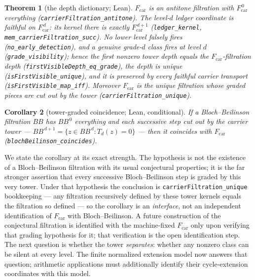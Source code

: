 \documentclass[11pt]{article}
\newtheorem{theorem}{Theorem}[section]
\newtheorem{corollary}[theorem]{Corollary}
\theoremstyle{definition}
\theoremstyle{remark}
\newcommand{\Fcar}{F_{\mathrm{car}}}
\begin{document}
\begin{theorem}[the depth dictionary; Lean]\label{thm:dictionary}
$\Fcar$ is an antitone filtration with $\Fcar^{\,0}$ everything
\textup{(\texttt{carrierFiltration\_antitone})}. The level-$d$ ledger
coordinate is faithful on $\Fcar^{\,d}$: its kernel there is exactly
$\Fcar^{\,d+1}$ \textup{(\texttt{ledger\_kernel},
\texttt{mem\_carrierFiltration\_succ})}. No lower level falsely fires
\textup{(\texttt{no\_early\_detection})}, and a genuine grade-$d$ class fires
at level $d$ \textup{(\texttt{grade\_visibility})}; hence the first nonzero
tower depth equals the $\Fcar$-filtration depth
\textup{(\texttt{firstVisibleDepth\_eq\_grade})}, the depth is unique
\textup{(\texttt{isFirstVisible\_unique})}, and it is preserved by every
faithful carrier transport \textup{(\texttt{isFirstVisible\_map\_iff})}.
Moreover $\Fcar$ is the unique filtration whose graded pieces are cut out by
the tower \textup{(\texttt{carrierFiltration\_unique})}.
\end{theorem}

\begin{corollary}[tower-graded coincidence; Lean, conditional]\label{cor:bb}
If a Bloch--Beilinson filtration \cite{Beilinson,Bloch,Murre} $BB$ has
$BB^{\,0}$ everything and each successive step cut out by the carrier tower ---
$BB^{\,d+1}=\{z\in BB^{\,d}:T_d(z)=0\}$ --- then it coincides with $\Fcar$
\textup{(\texttt{blochBeilinson\_coincides})}.
\end{corollary}

We state the corollary at its exact strength. The hypothesis is not the
existence of a Bloch--Beilinson filtration with its usual conjectural
properties; it is the far stronger assertion that every successive
Bloch--Beilinson step is graded by this very tower. Under that hypothesis the
conclusion is \texttt{carrierFiltration\_unique} bookkeeping --- any filtration
recursively defined by these tower kernels equals the filtration so defined ---
so the corollary is an \emph{interface}, not an independent identification of
$\Fcar$ with Bloch--Beilinson. A future construction of the conjectural
filtration is identified with the machine-fixed $\Fcar$ only upon verifying
that grading hypothesis for it; that verification is the open identification
step. The
next question is whether the tower \emph{separates}: whether any nonzero class
can be silent at every level. The finite normalized extension model now answers
that question; arithmetic applications must additionally identify their
cycle-extension coordinates with this model.
\end{document}
